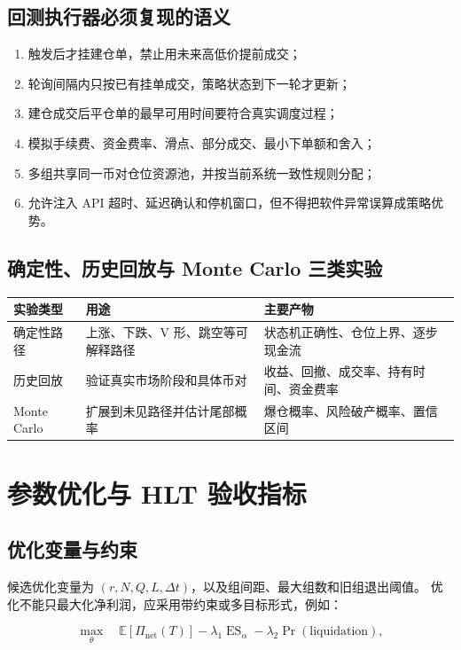 \documentclass[11pt,a4paper,fontset=none]{ctexart}
\begin{document}
\subsection{回测执行器必须复现的语义}

\begin{enumerate}
  \item 触发后才挂建仓单，禁止用未来高低价提前成交；
  \item 轮询间隔内只按已有挂单成交，策略状态到下一轮才更新；
  \item 建仓成交后平仓单的最早可用时间要符合真实调度过程；
  \item 模拟手续费、资金费率、滑点、部分成交、最小下单额和舍入；
  \item 多组共享同一币对仓位资源池，并按当前系统一致性规则分配；
  \item 允许注入 API 超时、延迟确认和停机窗口，但不得把软件异常误算成策略优势。
\end{enumerate}

\subsection{确定性、历史回放与 Monte Carlo 三类实验}

\begin{longtable}{p{3.0cm}p{5.0cm}p{5.7cm}}
  \toprule
  实验类型 & 用途 & 主要产物 \\
  \midrule
  \endhead
  确定性路径 & 上涨、下跌、V 形、跳空等可解释路径 & 状态机正确性、仓位上界、逐步现金流 \\
  历史回放 & 验证真实市场阶段和具体币对 & 收益、回撤、成交率、持有时间、资金费率 \\
  Monte Carlo & 扩展到未见路径并估计尾部概率 & 爆仓概率、风险破产概率、置信区间 \\
  \bottomrule
\end{longtable}

\section{参数优化与 HLT 验收指标}

\subsection{优化变量与约束}

候选优化变量为 $(r,N,Q,L,\Delta t)$，以及组间距、最大组数和旧组退出阈值。
优化不能只最大化净利润，应采用带约束或多目标形式，例如：

\begin{equation}
  \max_{\theta}\quad
  \mathbb{E}[\Pi_{\mathrm{net}}(T)]
  -\lambda_1\operatorname{ES}_{\alpha}
  -\lambda_2\Pr(\text{liquidation}),
\end{equation}
\end{document}
